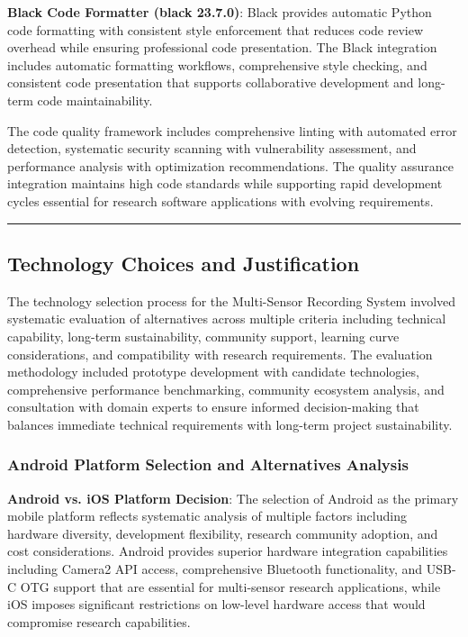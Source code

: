 \documentclass[11pt,a4paper]{article}
\begin{document}
\textbf{Black Code Formatter (black 23.7.0)}: Black provides automatic Python code formatting with consistent style
enforcement that reduces code review overhead while ensuring professional code presentation. The Black integration
includes automatic formatting workflows, comprehensive style checking, and consistent code presentation that supports
collaborative development and long-term code maintainability.

The code quality framework includes comprehensive linting with automated error detection, systematic security scanning
with vulnerability assessment, and performance analysis with optimization recommendations. The quality assurance
integration maintains high code standards while supporting rapid development cycles essential for research software
applications with evolving requirements.

\hrule

\subsection{Technology Choices and Justification}

The technology selection process for the Multi-Sensor Recording System involved systematic evaluation of alternatives
across multiple criteria including technical capability, long-term sustainability, community support, learning curve
considerations, and compatibility with research requirements. The evaluation methodology included prototype development
with candidate technologies, comprehensive performance benchmarking, community ecosystem analysis, and consultation with
domain experts to ensure informed decision-making that balances immediate technical requirements with long-term project
sustainability.

\subsubsection{Android Platform Selection and Alternatives Analysis}

\textbf{Android vs. iOS Platform Decision}: The selection of Android as the primary mobile platform reflects systematic
analysis of multiple factors including hardware diversity, development flexibility, research community adoption, and
cost considerations. Android provides superior hardware integration capabilities including Camera2 API access,
comprehensive Bluetooth functionality, and USB-C OTG support that are essential for multi-sensor research applications,
while iOS imposes significant restrictions on low-level hardware access that would compromise research capabilities.
\end{document}
